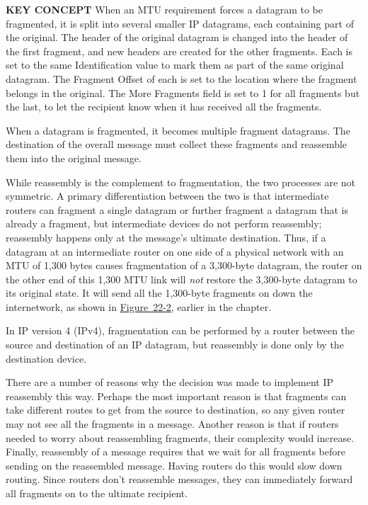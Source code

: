 \documentclass[b5paper,11pt]{memoir}
\begin{document}
{\textbf{KEY CONCEPT}} When an MTU requirement forces a datagram to be
fragmented, it is split into several smaller IP datagrams, each
containing part of the original. The header of the original datagram is
changed into the header of the first fragment, and new headers are
created for the other fragments. Each is set to the same Identification
value to mark them as part of the same original datagram. The Fragment
Offset of each is set to the location where the fragment belongs in the
original. The More Fragments field is set to 1 for all fragments but the
last, to let the recipient know when it has received all the fragments.

\protect\hypertarget{ch22s03.html}{}{}

\protect\hypertarget{ch22s03.htmlux5cux23idx-CHP-22-0814}{}{}When a
datagram is fragmented, it becomes multiple fragment datagrams. The
destination of the overall message must collect these fragments and
reassemble them into the original message.

While
\protect\hypertarget{ch22s03.htmlux5cux23idx-CHP-22-0815}{}{}reassembly
is the complement to fragmentation, the two processes are not symmetric.
A primary differentiation between the two is that intermediate routers
can fragment a single datagram or further fragment a datagram that is
already a fragment, but intermediate devices do not perform reassembly;
reassembly happens only at the message's ultimate destination. Thus, if
a datagram at an intermediate router on one side of a physical network
with an MTU of 1,300 bytes causes fragmentation of a 3,300-byte
datagram, the router on the other end of this 1,300 MTU link will
{\emph{not}} restore the 3,300-byte datagram to its original state. It
will send all the 1,300-byte fragments on down the internetwork, as
shown in
\protect\hyperlink{ch22.htmlux5cux23ipv4_datagram_fragmentation_this_example}{Figure~22-2},
earlier in the chapter.

In IP version 4 (IPv4), fragmentation can be performed by a router
between the source and destination of an IP datagram, but reassembly is
done only by the destination device.

There are a number of reasons why the decision was made to implement IP
reassembly this way. Perhaps the most important reason is that fragments
can take different routes to get from the source to destination, so any
given router may not see all the fragments in a message. Another reason
is that if routers needed to worry about reassembling fragments, their
complexity would increase. Finally, reassembly of a message requires
that we wait for all fragments before sending on the reassembled
message. Having routers do this would slow down routing. Since routers
don't reassemble messages, they can immediately forward all fragments on
to the ultimate recipient.
\end{document}
